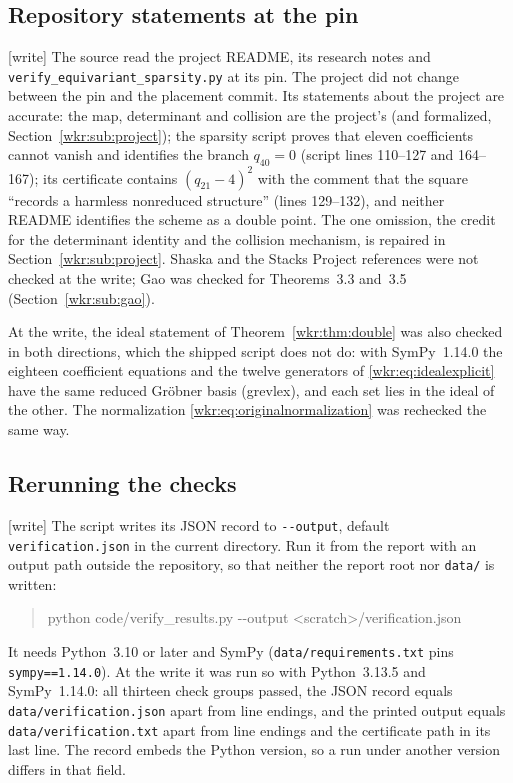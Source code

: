 \documentclass[11pt,a4paper]{article}
\numberwithin{equation}{section}
\theoremstyle{definition}
\theoremstyle{remark}
\newcommand{\wtag}{\textup{[write]}}%
\newcommand{\rpath}[1]{\nolinkurl{#1}}
\begin{document}
\subsection{Repository statements at the pin}\label{wkr:app:pinned}
\wtag{} The source read the project README, its research notes and
\rpath{verify_equivariant_sparsity.py} at its pin. The project did not
change between the pin and the placement commit. Its statements about the
project are accurate: the map, determinant and collision are the
project's (and formalized, Section~\ref{wkr:sub:project}); the sparsity
script proves that eleven coefficients cannot vanish and identifies the
branch $q_{40}=0$ (script lines 110--127 and 164--167); its certificate
contains $(q_{21}-4)^2$ with the comment that the square ``records a
harmless nonreduced structure'' (lines 129--132), and neither README
identifies the scheme as a double point. The one omission, the credit for
the determinant identity and the collision mechanism, is repaired in
Section~\ref{wkr:sub:project}. Shaska \cite{shaska} and the Stacks Project
references were not checked at the write; Gao \cite{gao} was checked for
Theorems~3.3 and~3.5 (Section~\ref{wkr:sub:gao}).

At the write, the ideal statement of Theorem~\ref{wkr:thm:double} was also
checked in both directions, which the shipped script does not do: with
SymPy~1.14.0 the eighteen coefficient equations and the twelve generators
of \eqref{wkr:eq:idealexplicit} have the same reduced Gr\"obner basis
(grevlex), and each set lies in the ideal of the other. The normalization
\eqref{wkr:eq:originalnormalization} was rechecked the same way.

\subsection{Rerunning the checks}\label{wkr:app:rerun}
\wtag{} The script writes its JSON record to \texttt{-{}-output}, default
\rpath{verification.json} in the current directory. Run it from the report
with an output path outside the repository, so that neither the report
root nor \rpath{data/} is written:
\begin{quote}\ttfamily
python code/verify\_results.py -{}-output <scratch>/verification.json
\end{quote}
It needs Python~3.10 or later and SymPy (\rpath{data/requirements.txt}
pins \texttt{sympy==1.14.0}). At the write it was run so with Python~3.13.5
and SymPy~1.14.0: all thirteen check groups passed, the JSON record equals
\rpath{data/verification.json} apart from line endings, and the printed
output equals \rpath{data/verification.txt} apart from line endings and the
certificate path in its last line. The record embeds the Python version, so
a run under another version differs in that field.
\end{document}
